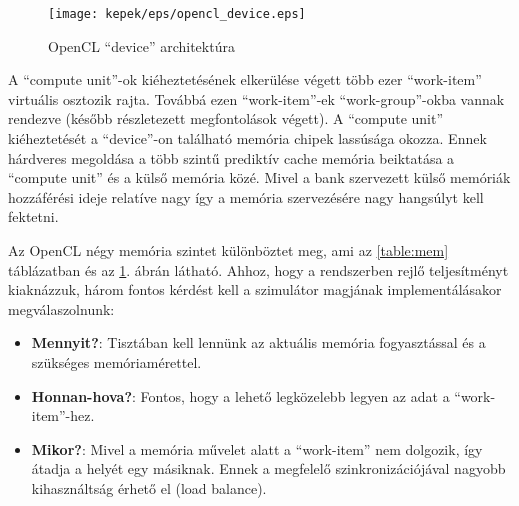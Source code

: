 	\begin{figure}[!ht]
		\centering
		\texttt{[image: kepek/eps/opencl\_device.eps]}
		\caption{\scriptsize OpenCL ``device'' architektúra \cite{opencl}} 
		\label{fig:device} 
	\end{figure}
	
	A ``compute unit''-ok kiéheztetésének elkerülése végett több ezer
	``work-item'' virtuális osztozik rajta.
	Továbbá ezen ``work-item''-ek ``work-group''-okba vannak rendezve (később
	részletezett megfontolások végett).
	A ``compute unit'' kiéheztetését a ``device''-on található memória chipek lassúsága okozza.
	Ennek hárdveres megoldása a több szintű prediktív cache memória beiktatása a
	``compute unit'' és a külső memória közé.
	Mivel a bank szervezett külső memóriák hozzáférési ideje relatíve nagy
	így a memória szervezésére nagy hangsúlyt kell fektetni.
	
	Az OpenCL négy memória szintet különböztet meg, ami az
	\ref{table:mem} táblázatban és az \ref{fig:device}. ábrán látható.
	Ahhoz, hogy a rendszerben rejlő teljesítményt kiaknázzuk, három fontos kérdést
	kell a szimulátor magjának implementálásakor megválaszolnunk:
	\begin{itemize}
		\item \textbf{Mennyit?}: Tisztában kell lennünk az aktuális
		memória fogyasztással és a szükséges memóriamérettel.
		\item \textbf{Honnan-hova?}: Fontos, hogy a lehető legközelebb legyen az adat
		a ``work-item''-hez.
		\item \textbf{Mikor?}: Mivel a memória művelet alatt a ``work-item'' nem
		dolgozik, így átadja a helyét egy másiknak. Ennek a megfelelő
		szinkronizációjával nagyobb kihasználtság érhető el (load balance).
	\end{itemize}
	
	\begin{table}[!h]
	\renewcommand{\arraystretch}{1.3}
	\caption{\scriptsize OpenCL memória szintek}
	\label{table:mem}
	\centering
	\end{table}
	

